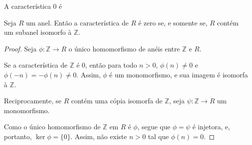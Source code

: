A característica $0$ é

\begin{prop}
    Seja $R$ um anel. Então a característica de $R$ é zero se, e somente se, $R$ contém um subanel isomorfo à $\mathbb Z$.
\end{prop}

\begin{proof}
    Seja $\phi:\mathbb Z\rightarrow R$ o único homomorfismo de anéis entre $\mathbb Z$ e $R$.

    Se a característica de $\mathbb Z$ é $0$, então para todo $n>0$, $\phi(n)\neq 0$ e $\phi(-n)=-\phi(n)\neq 0$. Assim, $\phi$ é um monomorfismo, e sua imagem é isomorfa à $\mathbb Z$.

    Reciprocamente, se $R$ contém uma cópia isomorfa de $\mathbb Z$, seja $\psi:\mathbb Z\rightarrow R$ um monomorfismo.

    Como o único homomorfismo de $\mathbb Z$ em $R$ é $\phi$, segue que $\phi=\psi$ é injetora, e, portanto, $\ker \phi=\{0\}$. Assim, não existe $n>0$ tal que $\phi(n)=0$.
\end{proof}



